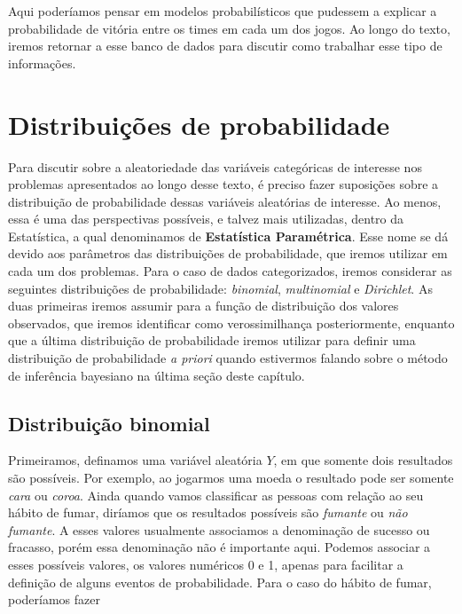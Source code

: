 \documentclass[]{book}
\begin{document}
Aqui poderíamos pensar em modelos probabilísticos que pudessem a explicar a probabilidade de vitória entre os times em cada um dos jogos. Ao longo do texto, iremos retornar a esse banco de dados para discutir como trabalhar esse tipo de informações.

\hypertarget{distribuicoes-de-probabilidade}{%
\section{Distribuições de probabilidade}\label{distribuicoes-de-probabilidade}}

Para discutir sobre a aleatoriedade das variáveis categóricas de interesse nos problemas apresentados ao longo desse texto, é preciso fazer suposições sobre a distribuição de probabilidade dessas variáveis aleatórias de interesse. Ao menos, essa é uma das perspectivas possíveis, e talvez mais utilizadas, dentro da Estatística, a qual denominamos de \textbf{Estatística Paramétrica}. Esse nome se dá devido aos parâmetros das distribuições de probabilidade, que iremos utilizar em cada um dos problemas. Para o caso de dados categorizados, iremos considerar as seguintes distribuições de probabilidade: \emph{binomial}, \emph{multinomial} e \emph{Dirichlet}. As duas primeiras iremos assumir para a função de distribuição dos valores observados, que iremos identificar como verossimilhança posteriormente, enquanto que a última distribuição de probabilidade iremos utilizar para definir uma distribuição de probabilidade \emph{a priori} quando estivermos falando sobre o método de inferência bayesiano na última seção deste capítulo.

\hypertarget{distribuicao-binomial}{%
\subsection{Distribuição binomial}\label{distribuicao-binomial}}

Primeiramos, definamos uma variável aleatória \(Y\), em que somente dois resultados são possíveis. Por exemplo, ao jogarmos uma moeda o resultado pode ser somente \emph{cara} ou \emph{coroa}. Ainda quando vamos classificar as pessoas com relação ao seu hábito de fumar, diríamos que os resultados possíveis são \emph{fumante} ou \emph{não fumante}. A esses valores usualmente associamos a denominação de sucesso ou fracasso, porém essa denominação não é importante aqui. Podemos associar a esses possíveis valores, os valores numéricos 0 e 1, apenas para facilitar a definição de alguns eventos de probabilidade. Para o caso do hábito de fumar, poderíamos fazer
\end{document}
